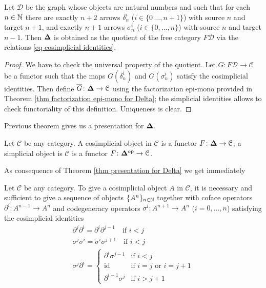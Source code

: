 \begin{refsection}
\begin{thm} \label{thm presentation for Delta}
Let $\mathcal D$ be the graph whose objects are natural numbers and such that for each $n \in \mathbb{N}$ there are exactly $n+2$ arrows $\delta^i_n$ ($i \in \{0\,\ldots,n+1\}$) with source $n$ and target $n+1$, and exactly $n+1$ arrows $\sigma^i_n$ ($i \in \{0,\ldots,n\}$) with source $n$ and target $n-1$. Then $\mathbf \Delta$ is obtained as the quotient of the free category $F \mathcal D$ via the relations \eqref{eq cosimplicial identities}.
\end{thm}

\begin{proof}
We have to check the universal property of the quotient. Let $G \colon F \mathcal D \to \mathcal C$ be a functor such that the maps $G(\delta^i_n)$ and $G(\sigma^i_n)$ satisfy the cosimplicial identities. Then define $\overline{G} \colon \mathbf \Delta \to \mathcal C$ using the factorization epi-mono provided in Theorem \ref{thm factorization epi-mono for Delta}; the simplicial identities allows to check functoriality of this definition. Uniqueness is clear.
\end{proof}

\begin{rmk}
Previous theorem gives us a presentation for $\mathbf \Delta$.
\end{rmk}

\begin{defin} \label{def (co)simplicial objects}
Let $\mathcal C$ be any category. A cosimplicial object in $\mathcal C$ is a functor $F \colon \mathbf \Delta \to \mathcal C$; a simplicial object is $\mathcal C$ is a functor $F \colon \mathbf \Delta^\text{op} \to \mathcal C$.
\end{defin}

As consequence of Theorem \ref{thm presentation for Delta} we get immediately

\begin{cor}
Let $\mathcal C$ be any category. To give a cosimplicial object $A$ in $\mathcal C$, it is necessary and sufficient to give a sequence of objects $\{A^n\}_{n \in \mathbb{N}}$ together with coface operators $\partial^i \colon A^{n-1} \to A^n$ and codegeneracy operators $\sigma^i \colon A^{n+1} \to A^n$ ($i = 0,\ldots,n$) satisfying the cosimplicial identities
\begin{gather*}
\partial^j \partial^i = \partial^i \partial^{j-1} \quad \text{if } i < j \\
\sigma^j \sigma^i = \sigma^i \sigma^{j+1} \quad \text{if } i < j \\
\sigma^j \partial^i = \begin{cases}
\partial^i \sigma^{j-1} & \text{if } i < j \\
\mathrm{id} & \text{if } i = j \text{ or } i = j+1 \\
\partial^{i-1} \sigma^j & \text{if } i > j+1
\end{cases}
\end{gather*}
\end{cor}


\end{refsection}
